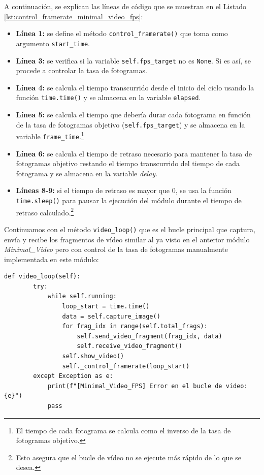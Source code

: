 A continuación, se explican las líneas de código que se muestran en el Listado \ref{lst:control_framerate_minimal_video_fps}:
\begin{itemize}
    \item \textbf{Línea 1:} se define el método \texttt{control\_framerate()} que toma como argumento \texttt{start\_time}.
    \item \textbf{Línea 3:} se verifica si la variable \texttt{self.fps\_target} no es \texttt{None}. Si es así, se procede a controlar la tasa de fotogramas.
    \item \textbf{Línea 4:} se calcula el tiempo transcurrido desde el inicio del ciclo usando la función \texttt{time.time()} y se almacena en la variable \texttt{elapsed}.
    \item \textbf{Línea 5:} se calcula el tiempo que debería durar cada fotograma en función de la tasa de fotogramas objetivo (\texttt{self.fps\_target}) y se almacena en la variable \texttt{frame\_time}.\footnote{El tiempo de cada fotograma se calcula como el inverso de la tasa de fotogramas objetivo.}
    \item \textbf{Línea 6:} se calcula el tiempo de retraso necesario para mantener la tasa de fotogramas objetivo restando el tiempo transcurrido del tiempo de cada fotograma y se almacena en la variable \textit{delay}.
    \item \textbf{Líneas 8-9:} si el tiempo de retraso es mayor que 0, se usa la función \texttt{time.sleep()} para pausar la ejecución del módulo durante el tiempo de retraso calculado.\footnote{Esto asegura que el bucle de vídeo no se ejecute más rápido de lo que se desea.}
\end{itemize}
\vspace{\baselineskip}

Continuamos con el método \texttt{video\_loop()} que es el bucle principal que captura, envía y recibe los fragmentos de vídeo similar al ya visto en el anterior módulo \textit{Minimal\_Video} pero con control de la tasa de fotogramas manualmente implementada en este módulo:
\begin{lstlisting}[style=pythonstyle, caption={Método \texttt{video\_loop()} de \textit{Minimal\_Video\_FPS}.}, label={lst:video_loop_minimal_video_fps}]
def video_loop(self):
        try:
            while self.running:
                loop_start = time.time()
                data = self.capture_image()
                for frag_idx in range(self.total_frags):
                    self.send_video_fragment(frag_idx, data)
                    self.receive_video_fragment()
                self.show_video()
                self._control_framerate(loop_start)
        except Exception as e:
            print(f"[Minimal_Video_FPS] Error en el bucle de video: {e}")
            pass
\end{lstlisting}
\vspace{\baselineskip}

